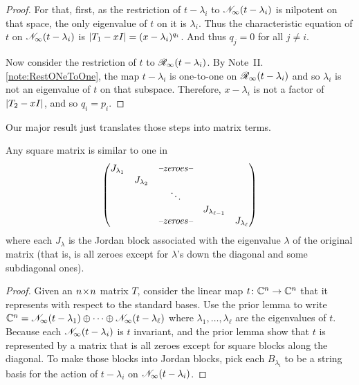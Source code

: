 \begin{proof}
For that, first,
as the restriction of \( t-\lambda_i \) to \( \mathscr{N}_\infty(t-\lambda_i) \)
is nilpotent on that space,
the only eigenvalue of \( t \) on it is \( \lambda_i \).
Thus the characteristic equation of \( t \) on
\( \mathscr{N}_\infty(t-\lambda_i) \) is
\( \deter{T_1-xI}=(x-\lambda_i)^{q_i} \).
And thus $q_j=0$ for all $j\neq i$.

Now consider the restriction of \( t \) to \( \mathscr{R}_\infty(t-\lambda_i) \).
By Note~II.\ref{note:RestONeToOne}, the map
\( t-\lambda_i \) is one-to-one on
\( \mathscr{R}_\infty(t-\lambda_i) \) and so \( \lambda_i \) is not an
eigenvalue of \( t \) on that subspace.
Therefore, \( x-\lambda_i \) is not a factor of \( \deter{T_2-xI} \),
and so \( q_i=p_i \).
\end{proof}

Our major result just
translates those steps into matrix terms.

\begin{theorem}
Any square matrix is similar to one in 
\begin{equation*}
  \begin{pmatrix}
    J_{\lambda_1}  &     &\text{\textit{--zeroes--}}                 \\
         &J_{\lambda_2}                                              \\
         &     &\ddots                                     \\
         &     &                           &J_{\lambda_{\ell-1}}     \\
         &     &\text{\textit{--zeroes--}} &  &J_{\lambda_{\ell}}
  \end{pmatrix}
\end{equation*}
where each \( J_{\lambda} \) is the Jordan block associated with the
eigenvalue $\lambda$ of the original matrix (that is, is all zeroes except for
\( \lambda \)'s down the diagonal and some subdiagonal ones).
\end{theorem}

\begin{proof}
Given an \( n \! \times \! n \) matrix \( T \), consider the linear map
\( \mbox{$t\colon \mathbb{C}^n\to \mathbb{C}^n$} \) that it represents
with respect to the standard bases.
Use the prior lemma to write
\( \mathbb{C}^n=\mathscr{N}_\infty(t-\lambda_1)\oplus\cdots
        \oplus\mathscr{N}_\infty(t-\lambda_\ell) \)
where \( \lambda_1,\ldots,\lambda_\ell \) are the eigenvalues of \( t \).
Because each \( \mathscr{N}_\infty(t-\lambda_i) \)  is \( t \) invariant,
 and the prior lemma show
that \( t \) is represented by a matrix that is all zeroes except for square
blocks along the diagonal.
To make those blocks into Jordan blocks, pick each \( B_{\lambda_i} \)
to be a string basis for the action of \( t-\lambda_i \) on
\( \mathscr{N}_\infty(t-\lambda_i) \). 
\end{proof}

